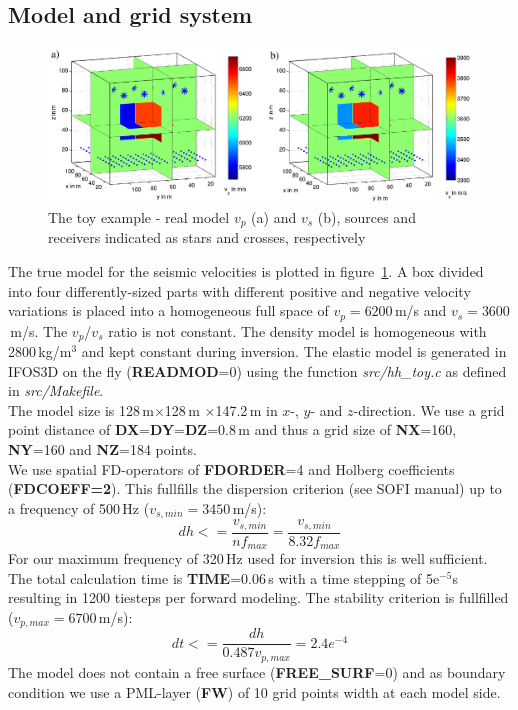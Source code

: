 \subsection{Model and grid system}
\begin{figure}[h!]
\begin{center}
\includegraphics[width=\textwidth]{fig_toy/toy_real_model}
\caption[Toy example - the real model and acquisition geometry]{The toy example - real model $v_p$ (a) and $v_s$ (b), sources and receivers indicated as stars and crosses, respectively}\label{fig:toy_model}
\end{center}
\end{figure}
The true model for the seismic velocities is plotted in figure~\ref{fig:toy_model}. A box divided into four differently-sized parts with different positive and negative velocity variations is placed into a homogeneous full space of $v_p=6200$\,m/s and $v_s=3600$\,m/s. The $v_p$/$v_s$ ratio is not constant.
The density model is homogeneous with 2800\,kg/m$^3$ and kept constant during inversion. The elastic model is generated in IFOS3D on the fly (\textbf{READMOD}=0) using the function \textit{src/hh\_toy.c} as defined in \textit{src/Makefile}.\\
The model size is 128\,m$\times$128\,m $\times$147.2\,m in $x$-, $y$- and $z$-direction. We use a grid point distance of \textbf{DX}=\textbf{DY}=\textbf{DZ}=0.8\,m and thus a grid size of \textbf{NX}=160, \textbf{NY}=160 and \textbf{NZ}=184 points. \\
We use spatial FD-operators of \textbf{FDORDER}=4 and Holberg coefficients (\textbf{FDCOEFF=2}). This fullfills the dispersion criterion (see SOFI manual) up to a frequency of 500\,Hz ($v_{s,min}=3450$\,m/s):
\begin{equation}
 dh <= \frac{v_{s,min}}{nf_{max}}=\frac{v_{s,min}}{8.32f_{max}}
\end{equation}
For our maximum frequency of 320\,Hz used for inversion this is well sufficient. \\
The total calculation time is \textbf{TIME}=0.06\,s with a time stepping of 5e$^{-5}$s resulting in 1200 tiesteps per forward modeling. The stability criterion is fullfilled ($v_{p,max}=6700$\,m/s):
\begin{equation}
 dt<=\frac{dh}{0.487v_{p,max}}=2.4e^{-4}
\end{equation}
The model does not contain a free surface (\textbf{FREE\_SURF}=0) and as boundary condition we use a PML-layer (\textbf{FW}) of 10 grid points width at each model side.\\
